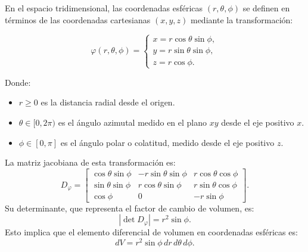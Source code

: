 \begin{definición}
En el espacio tridimensional, las coordenadas esféricas $(r, \theta, \phi)$ se definen en términos de las coordenadas cartesianas $(x, y, z)$ mediante la transformación:\\

\begin{minipage}{0.5\textwidth}
    \[
        \varphi(r, \theta, \phi) =
        \begin{cases}
            x = r\cos\theta \sin\phi, \\
            y = r\sin\theta \sin\phi, \\
            z = r\cos\phi.
        \end{cases}
    \]
\end{minipage}
\begin{minipage}{0.5\textwidth}
    \centering
    
\end{minipage}

Donde:
\begin{itemize}
    \item $r \geq 0$ es la distancia radial desde el origen.
    \item $\theta \in [0, 2\pi)$ es el ángulo azimutal medido en el plano $xy$ desde el eje positivo $x$.
    \item $\phi \in [0, \pi]$ es el ángulo polar o colatitud, medido desde el eje positivo $z$.
\end{itemize}

La matriz jacobiana de esta transformación es: $$ D_\varphi =
    \begin{bmatrix}
        \cos\theta \sin\phi & -r\sin\theta \sin\phi & r\cos\theta \cos\phi \\
        \sin\theta \sin\phi & r\cos\theta \sin\phi  & r\sin\theta \cos\phi \\
        \cos\phi            & 0                     & -r\sin\phi
    \end{bmatrix}.
$$
Su determinante, que representa el factor de cambio de volumen, es:
$$
    \left| \det D_\varphi \right| = r^2 \sin\phi.
$$
Esto implica que el elemento diferencial de volumen en coordenadas esféricas es:
$$
    dV = r^2 \sin\phi \, dr \, d\theta \, d\phi.
$$
\end{definición}

